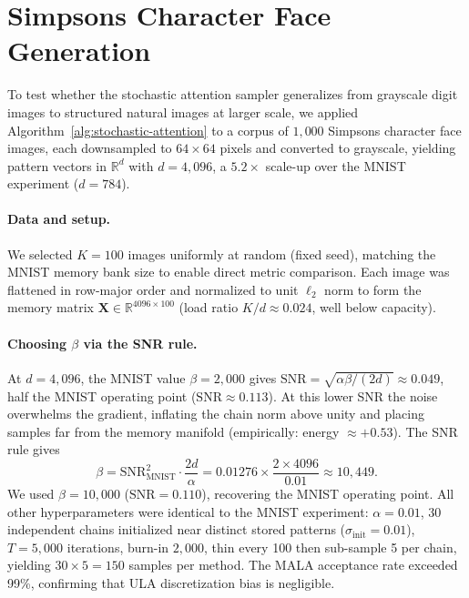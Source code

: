 \section{Simpsons Character Face Generation}\label{app:simpsons}

To test whether the stochastic attention sampler generalizes from grayscale digit images to structured natural images at larger scale, we applied Algorithm~\ref{alg:stochastic-attention} to a corpus of $1{,}000$ Simpsons character face images, each downsampled to $64\times 64$ pixels and converted to grayscale, yielding pattern vectors in $\mathbb{R}^{d}$ with $d=4{,}096$, a $5.2\times$ scale-up over the MNIST experiment ($d=784$).

\paragraph{Data and setup.}
We selected $K=100$ images uniformly at random (fixed seed), matching the MNIST memory bank size to enable direct metric comparison. Each image was flattened in row-major order and normalized to unit $\ell_2$ norm to form the memory matrix $\mathbf{X}\in\mathbb{R}^{4096\times 100}$ (load ratio $K/d\approx 0.024$, well below capacity).

\paragraph{Choosing $\beta$ via the SNR rule.}
At $d=4{,}096$, the MNIST value $\beta=2{,}000$ gives $\mathrm{SNR}=\sqrt{\alpha\beta/(2d)}\approx 0.049$, half the MNIST operating point ($\mathrm{SNR}\approx 0.113$). At this lower SNR the noise overwhelms the gradient, inflating the chain norm above unity and placing samples far from the memory manifold (empirically: energy $\approx +0.53$). The SNR rule gives
\begin{equation*}
\beta = \mathrm{SNR}_{\mathrm{MNIST}}^{2}\cdot\frac{2d}{\alpha}
= 0.01276 \times \frac{2\times 4096}{0.01} \approx 10{,}449.
\end{equation*}
We used $\beta=10{,}000$ ($\mathrm{SNR}=0.110$), recovering the MNIST operating point. All other hyperparameters were identical to the MNIST experiment: $\alpha=0.01$, 30 independent chains initialized near distinct stored patterns ($\sigma_{\mathrm{init}}=0.01$), $T=5{,}000$ iterations, burn-in $2{,}000$, thin every 100 then sub-sample 5 per chain, yielding $30\times 5=150$ samples per method. The MALA acceptance rate exceeded 99\%, confirming that ULA discretization bias is negligible.

